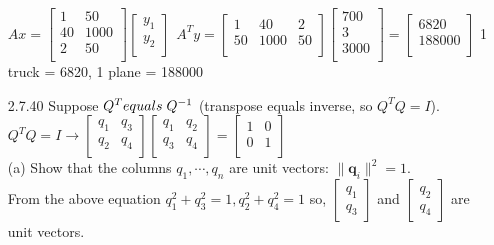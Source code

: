 \documentclass[10pt,twoside,reqno]{article}
\begin{document}
\begin{enumerate}
\vspace{3mm}
$
$$
Ax =
\begin{bmatrix}
1 & 50\\
40 & 1000\\
2 & 50\\
\end{bmatrix}
\begin{bmatrix}
y_1\\
y_2\\
\end{bmatrix}
\hspace{5pt}
A^Ty =
\begin{bmatrix}
1 & 40 & 2\\
50 & 1000 & 50\\
\end{bmatrix}
\begin{bmatrix}
700\\
3\\
3000\\
\end{bmatrix}
=
\begin{bmatrix}
6820\\
188000\\
\end{bmatrix}
$$
$
1 truck = 6820, 1 plane = 188000\\
\item[2.7.40] Suppose $Q^T equals \hspace{1mm} Q^{-1}$ (transpose equals inverse, so $Q^TQ = I$).\\
\vspace{3mm}
$
$$
Q^TQ = I \rightarrow
\begin{bmatrix}
q_1 & q_3\\
q_2 & q_4\\
\end{bmatrix}
\begin{bmatrix}
q_1 & q_2\\
q_3 & q_4\\
\end{bmatrix}
=
\begin{bmatrix}
1 & 0\\
0 & 1\\
\end{bmatrix}
$$
$\\
\vspace{3mm}
(a) Show that the columns $q_1, \cdots, q_n$ are unit vectors: $\lVert \pmb{q}_i \rVert^2 = 1$.\\
\vspace{3mm}
From the above equation $q_1^2 + q_3^2 = 1, q_2^2 + q_4^2 = 1$ so,  $\left[\begin{smallmatrix} q_1\\ q_3 \end{smallmatrix} \right]$ and  $\left[\begin{smallmatrix} q_2\\ q_4 \end{smallmatrix} \right]$ are unit vectors.\\

\end{enumerate}
\end{document}
